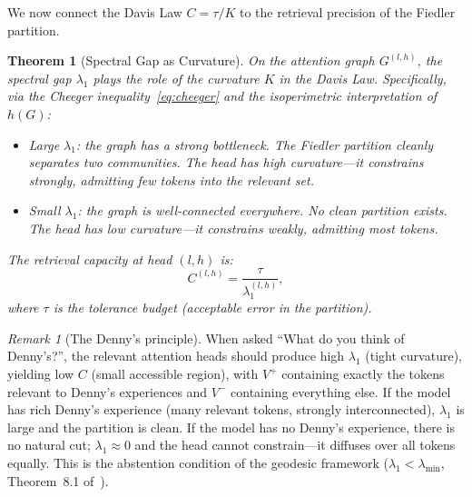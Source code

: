\documentclass[11pt]{article}
\newtheorem{theorem}[definition]{Theorem}
\theoremstyle{remark}
\newtheorem{remark}[definition]{Remark}
\begin{document}
We now connect the Davis Law $C = \tau/K$ to the retrieval 
precision of the Fiedler partition.

\begin{theorem}[Spectral Gap as Curvature]\label{thm:gap_curvature}
On the attention graph $G^{(l,h)}$, the spectral gap $\lambda_1$ 
plays the role of the curvature $K$ in the Davis Law. 
Specifically, via the Cheeger inequality~\eqref{eq:cheeger} 
and the isoperimetric interpretation of $h(G)$:
\begin{itemize}[nosep]
  \item Large $\lambda_1$: the graph has a strong bottleneck. 
    The Fiedler partition cleanly separates two communities. 
    The head has \emph{high curvature}---it constrains 
    strongly, admitting few tokens into the relevant set.
  \item Small $\lambda_1$: the graph is well-connected 
    everywhere. No clean partition exists. The head has 
    \emph{low curvature}---it constrains weakly, admitting 
    most tokens.
\end{itemize}
The retrieval capacity at head $(l,h)$ is:
\begin{equation}\label{eq:C_head}
  C^{(l,h)} = \frac{\tau}{\lambda_1^{(l,h)}},
\end{equation}
where $\tau$ is the tolerance budget (acceptable error in the 
partition).
\end{theorem}

\begin{remark}[The Denny's principle]\label{rem:dennys}
When asked ``What do you think of Denny's?'', the relevant 
attention heads should produce high $\lambda_1$ (tight 
curvature), yielding low $C$ (small accessible region), with 
$V^+$ containing exactly the tokens relevant to Denny's 
experiences and $V^-$ containing everything else. If the model 
has rich Denny's experience (many relevant tokens, strongly 
interconnected), $\lambda_1$ is large and the partition is 
clean. If the model has no Denny's experience, there is no 
natural cut; $\lambda_1 \approx 0$ and the head cannot 
constrain---it diffuses over all tokens equally. This is the 
abstention condition of the geodesic framework 
($\lambda_1 < \lambda_{\min}$, Theorem~8.1 
of~\cite{davis2026geodesic}).
\end{remark}
\end{document}
